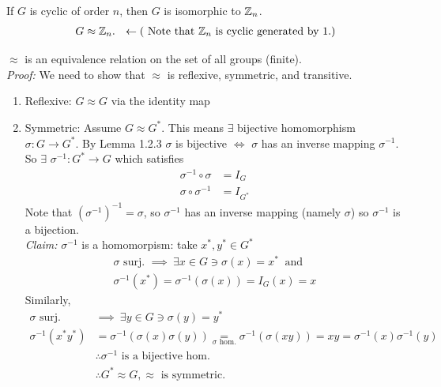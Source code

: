 \begin{corollary}
If $G$ is cyclic of order $n$, then $G$ is isomorphic to ${\mathbb{ Z}}_n$.\\
\begin{align}
    G\approx {\mathbb{ Z}}_n . \ \ \leftarrow (\text{ Note that }{\mathbb{ Z}}_n \text{ is cyclic generated by } 1.)\nonumber
\end{align}
\end{corollary}

\begin{proposition}
$\approx$ is an equivalence relation on the set of all groups (finite).\\
\textit{Proof:} We need to show that $\approx$ is reflexive, symmetric, and transitive.
\begin{enumerate}
    \item Reflexive: $G\approx G$ via the identity map
    \item Symmetric: Assume $G\approx G^*$. This means $\exists$ bijective homomorphism $\sigma: G\rightarrow G^*$. By Lemma 1.2.3 $\sigma$ is bijective $\iff$ $\sigma$ has an inverse mapping $\sigma^{-1}$. So $\exists$ $\sigma^{-1}: G^*\rightarrow G$ which satisfies
    \begin{align}
        \sigma^{-1}\circ \sigma &= I_G \nonumber \\
        \sigma\circ \sigma^{-1}&=I_{G^*}\nonumber
    \end{align}
    Note that $(\sigma^{-1})^{-1}=\sigma $, so $\sigma^{-1}$ has an inverse mapping (namely $\sigma$) so $\sigma^{-1}$ is a bijection.\\
    \textit{Claim:} $\sigma^{-1}$ is a homomorpism: take $x^*,y^*\in G^*$
    \begin{align}
        \sigma \text{ surj. } \implies \ \exists x\in G \ni \sigma(x)=x^* \ \text{ and} \nonumber \\
        \sigma^{-1}(x^*)=\sigma^{-1}(\sigma(x))=I_G(x)=x \nonumber
    \end{align}
    Similarly,
    \begin{align}
        \sigma \text{ surj. }&\implies \ \exists y\in G \ni \sigma(y)=y^* \nonumber \\
        \sigma^{-1}(x^*y^*)&=\sigma^{-1}(\sigma(x)\sigma(y))\underset{\sigma \text{ hom.}}{=}\sigma^{-1}(\sigma(xy))=xy=\sigma^{-1}(x)\sigma^{-1}(y) \nonumber \\
        &\therefore \sigma^{-1} \text{ is a bijective hom.} \nonumber \\
        &\therefore G^*\approx G, \approx \text{ is symmetric}. \nonumber

\end{align}
\end{enumerate}
\end{proposition}
